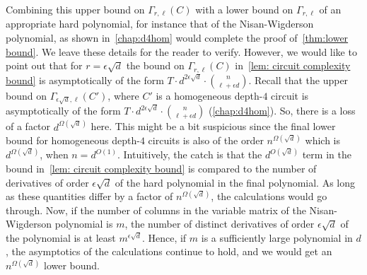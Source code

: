 Combining this upper bound on $\Gamma_{r, \ell}(C)$ with a lower bound on $\Gamma_{r, \ell}$ of an appropriate hard polynomial, for instance that of the Nisan-Wigderson polynomial, as shown in~\autoref{chap:d4hom} would complete the proof of~\autoref{thm:lower bound}. We leave these details for the reader to verify. However, we would like to point out that for $r = \epsilon\sqrt{d}$ the bound on $\Gamma_{r, \ell}(C)$ in~\autoref{lem: circuit complexity bound} is asymptotically of the form $T\cdot d^{2\epsilon\sqrt{d}}\cdot {n \choose \ell + \epsilon d}$. Recall that the upper bound on $\Gamma_{\epsilon\sqrt{d}, \ell}(C')$, where $C'$ is a homogeneous depth-$4$ circuit is asymptotically of the form   $T\cdot d^{2\epsilon\sqrt{d}}\cdot {n \choose \ell + \epsilon d}$ (\autoref{chap:d4hom}). So, there is a loss of a factor $d^{\Omega(\sqrt{d})}$ here. This might be a bit suspicious since the final lower bound for homogeneous depth-$4$ circuits is also of the order $n^{\Omega(\sqrt{d})}$ which is $d^{\Omega(\sqrt{d})}$, when $n = d^{O(1)}$. Intuitively, the catch is that the $d^{O(\sqrt{d})}$ term in the bound in~\autoref{lem: circuit complexity bound} is compared to the number of derivatives of order $\epsilon\sqrt{d}$ of the hard polynomial in the final polynomial. As long as these quantities differ by a factor of $n^{\Omega(\sqrt{d})}$, the calculations would go through. Now, if the number of columns in the variable matrix of the Nisan-Wigderson polynomial is $m$, the number of distinct derivatives of order $\epsilon\sqrt{d}$ of the polynomial is at least $m^{\epsilon\sqrt{d}}$. Hence, if $m$ is a sufficiently large polynomial in $d$, the asymptotics of the calculations continue to hold, and we would get an $n^{\Omega(\sqrt{d})}$ lower bound. 



